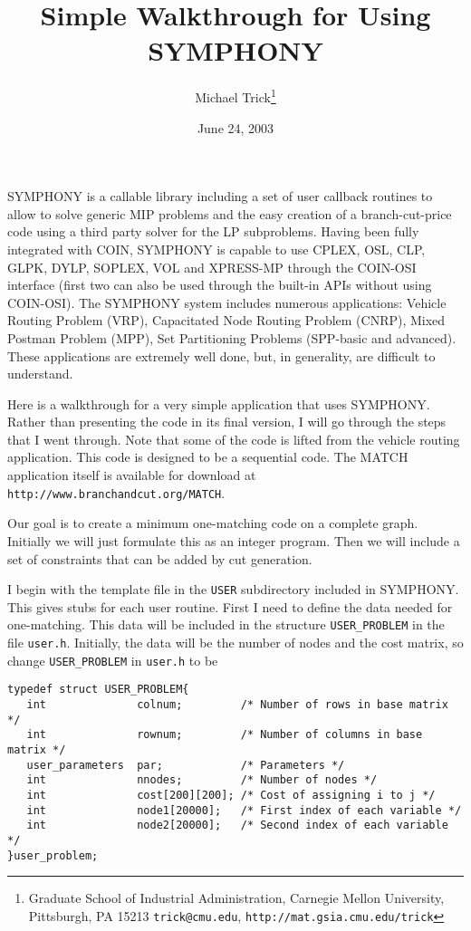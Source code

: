 \documentclass[11pt]{article}
\begin{document}
\title{Simple Walkthrough for Using SYMPHONY}
\author{Michael Trick\thanks{Graduate School of Industrial Administration,
Carnegie Mellon University, Pittsburgh, PA 15213 \texttt{trick@cmu.edu}, 
\texttt{http://mat.gsia.cmu.edu/trick}}}

\date{June 24, 2003}
\maketitle
\thispagestyle{empty}

SYMPHONY is a callable library including a set of user callback routines to 
allow to solve generic MIP problems and the easy creation of a branch-cut-price 
code using a third party solver for the LP subproblems. Having been fully 
integrated with COIN, SYMPHONY is capable to use CPLEX, OSL, CLP, GLPK, DYLP, 
SOPLEX, VOL and XPRESS-MP through the COIN-OSI interface (first two can also be 
used through the built-in APIs without using COIN-OSI). The SYMPHONY system 
includes numerous applications: Vehicle Routing Problem (VRP), Capacitated 
Node Routing Problem (CNRP), Mixed Postman Problem (MPP), 
Set Partitioning Problems (SPP-basic and advanced). 
These applications are extremely well done, but, in generality, are difficult 
to understand.

Here is a walkthrough for a very simple application that uses SYMPHONY. Rather
than presenting the code in its final version, I will go through the steps 
that I went through. Note that some of the code is lifted from the vehicle 
routing application. This code is designed to be a sequential code. The MATCH application itself is available for download at 
\texttt{http://www.branchandcut.org/MATCH}. 

Our goal is to create a minimum one-matching code on a complete graph.
Initially we will just formulate this as an integer program. Then we will
include a set of constraints that can be added by cut generation.

I begin with the template file in the \texttt{USER} subdirectory included in
SYMPHONY. This gives stubs for each user routine. First I need to define the
data needed for one-matching. This data will be included in the structure
\texttt{USER\_PROBLEM} in the file \texttt{user.h}.  Initially, the data will
be the number of nodes and the cost matrix, so change \texttt{USER\_PROBLEM}
in \texttt{user.h} to be
\begin{verbatim}
typedef struct USER_PROBLEM{
   int              colnum;         /* Number of rows in base matrix */
   int              rownum;         /* Number of columns in base matrix */
   user_parameters  par;            /* Parameters */
   int              nnodes;         /* Number of nodes */
   int              cost[200][200]; /* Cost of assigning i to j */ 
   int              node1[20000];   /* First index of each variable */
   int              node2[20000];   /* Second index of each variable */
}user_problem;
\end{verbatim}
\end{document}
